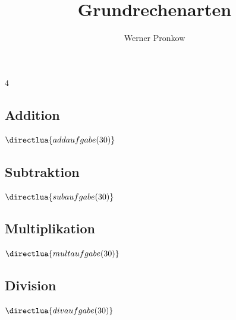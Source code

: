 \documentclass[fontsize=11pt]{scrartcl}
\begin{document}
\title{Grundrechenarten}
\author{Werner Pronkow}
\maketitle
\thispagestyle{empty}
\setlength{\columnseprule}{0.3pt}
\begin{multicols}{4}
\subsection*{Addition}
\(\directlua{addaufgabe(30)}\)
\subsection*{Subtraktion}
\(\directlua{subaufgabe(30)}\)
\subsection*{Multiplikation}
\(\directlua{multaufgabe(30)}\)
\subsection*{Division}
\(\directlua{divaufgabe(30)}\)
\end{multicols}
\end{document}
